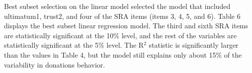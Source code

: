 \documentclass[12pt]{article}
\begin{document}
Best subset selection on the linear model selected the model that included ultimatum1, trust2, and four of the SRA items (items 3, 4, 5, and 6). Table 6 displays the best subset linear regression model. The third and sixth SRA items are statistically significant at the 10\% level, and the rest of the variables are statistically significant at the 5\% level. The R$^{2}$ statistic is significantly larger than the values in Table 4, but the model still explains only about 15\% of the variability in donations behavior.

\end{document}
